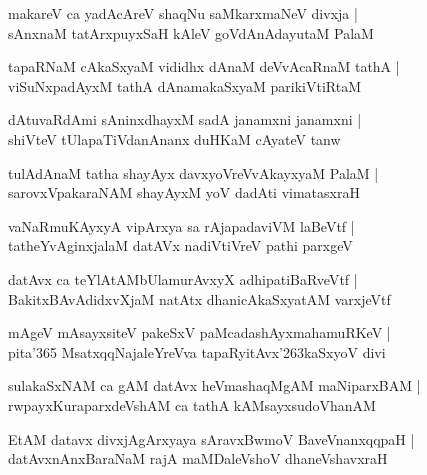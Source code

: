 \documentclass[twoside,12pt,openright]{book}
\def\S{\char'263}
\newcounter{shloka}[chapter]
\begin{document}
\begin{shloka}%
makareV ca yadAcAreV shaqNu saMkarxmaNeV divxja |\\
sAnxnaM tatArxpuyxSaH kAleV goVdAnAdayutaM PalaM 
\end{shloka}

\begin{shloka}%
tapaRNaM cAkaSxyaM vididhx dAnaM deVvAcaRnaM tathA |\\
viSuNxpadAyxM tathA dAnamakaSxyaM parikiVtiRtaM 
\end{shloka}

\begin{shloka}%
dAtuvaRdAmi sAninxdhayxM sadA janamxni janamxni |\\
shiVteV tUlapaTiVdanAnanx duHKaM cAyateV tanw
\end{shloka}

\begin{shloka}%
tulAdAnaM tatha shayAyx davxyoVreVvAkayxyaM PalaM |\\
sarovxVpakaraNAM shayAyxM yoV dadAti vimatasxraH 
\end{shloka}

\begin{shloka}%
vaNaRmuKAyxyA vipArxya sa rAjapadaviVM laBeVtf |\\
tatheYvAginxjalaM datAVx nadiVtiVreV pathi parxgeV 
\end{shloka}

\begin{shloka}%
datAvx ca teYlAtAMbUlamurAvxyX adhipatiBaRveVtf |\\
BakitxBAvAdidxvXjaM natAtx dhanicAkaSxyatAM varxjeVtf 
\end{shloka}

\begin{shloka}%
mAgeV mAsayxsiteV pakeSxV paMcadashAyxmahamuRKeV |\\
pita\char'365 MsatxqqNajaleYreVva tapaRyitAvx\S kaSxyoV divi
\end{shloka}

\begin{shloka}%
sulakaSxNAM ca gAM datAvx heVmashaqMgAM maNiparxBAM |\\
rwpayxKuraparxdeVshAM ca tathA kAMsayxsudoVhanAM 
\end{shloka}

\begin{shloka}%
EtAM datavx divxjAgArxyaya sAravxBwmoV BaveVnanxqqpaH |\\
datAvxnAnxBaraNaM rajA maMDaleVshoV dhaneVshavxraH 
\end{shloka}
\end{document}
